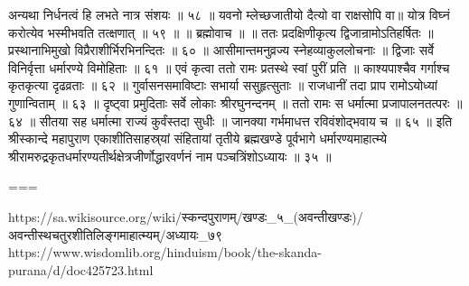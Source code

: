 अन्यथा निर्धनत्वं हि लभते नात्र संशयः ॥ ५८ ॥
यवनो म्लेच्छजातीयो दैत्यो वा राक्षसोपि वा॥
योत्र विघ्नं करोत्येव भस्मीभवति तत्क्षणात् ॥ ५९ ॥
॥ ब्रह्मोवाच ॥ ॥
ततः प्रदक्षिणीकृत्य द्विजान्रामोऽतिहर्षितः ॥
प्रस्थानाभिमुखो विप्रैराशीर्भिरभिनन्दितः ॥ ६० ॥
आसीमान्तमनुव्रज्य स्नेहव्याकुललोचनाः ॥
द्विजाः सर्वे विनिर्वृत्ता धर्मारण्ये विमोहिताः ॥ ६१ ॥
एवं कृत्वा ततो रामः प्रतस्थे स्वां पुरीं प्रति ॥
काश्यपाश्चैव गर्गाश्च कृतकृत्या दृढव्रताः ॥ ६२ ॥
गुर्वासनसमाविष्टाः सभार्या ससुहृत्सुताः ॥
राजधानीं तदा प्राप रामोऽयोध्यां गुणान्विताम् ॥ ६३ ॥
दृष्ट्वा प्रमुदिताः सर्वे लोकाः श्रीरघुनन्दनम् ॥
ततो रामः स धर्मात्मा प्रजापालनतत्परः ॥ ६४ ॥
सीतया सह धर्मात्मा राज्यं कुर्वंस्तदा सुधीः ॥
जानक्या गर्भमाधत्त रविवंशोद्भवाय च ॥ ६५ ॥
इति श्रीस्कान्दे महापुराण एकाशीतिसाहस्र्यां संहितायां तृतीये ब्रह्मखण्डे पूर्वभागे धर्मारण्यमाहात्म्ये श्रीरामरुद्रकृतधर्मारण्यतीर्थक्षेत्रजीर्णोद्धारवर्णनं नाम पञ्चत्रिंशोऽध्यायः ॥ ३५ ॥

===

https://sa.wikisource.org/wiki/स्कन्दपुराणम्/खण्डः_५_(अवन्तीखण्डः)/अवन्तीस्थचतुरशीतिलिङ्गमाहात्म्यम्/अध्यायः_७९
https://www.wisdomlib.org/hinduism/book/the-skanda-purana/d/doc425723.html


